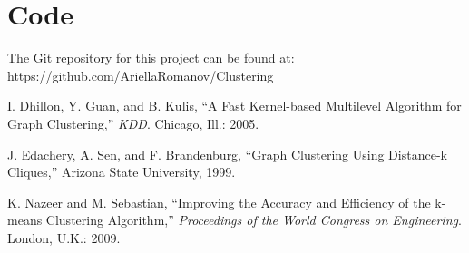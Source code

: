 \documentclass[12pt]{article}
\begin{document}
\newpage
\section{Code}
\label{appendix:code}
The Git repository for this project can be found at:
\newline\newline
https://github.com/AriellaRomanov/Clustering

\newpage
\begin{thebibliography}{9}

I. Dhillon, Y. Guan, and B. Kulis, ``A Fast Kernel-based Multilevel Algorithm for Graph Clustering,'' \textit{KDD}. Chicago, Ill.: 2005.
 
J. Edachery, A. Sen, and F. Brandenburg, ``Graph Clustering Using Distance-k Cliques,'' Arizona State University, 1999.
 
K. Nazeer and M. Sebastian, ``Improving the Accuracy and Efficiency of the k-means Clustering Algorithm,'' 
\textit{Proceedings of the World Congress on Engineering}. London, U.K.: 2009.

\end{thebibliography}

\end{document}
